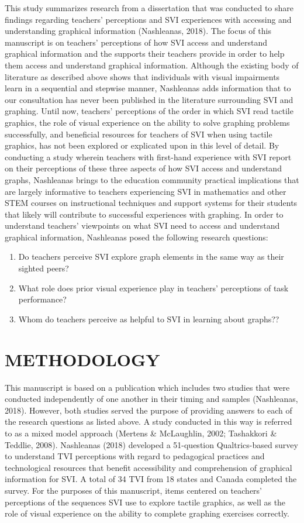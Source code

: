 \documentclass[11.5pt]{sig-alternate} %
\begin{document}
\begin{large}
This study summarizes research from a dissertation that was conducted to share findings regarding teachers’ perceptions and SVI experiences with accessing and understanding graphical information (Nashleanas, 2018). The focus of this manuscript is on teachers’ perceptions of how SVI access and understand graphical information and the supports their teachers provide in order to help them access and understand graphical information. Although the existing body of literature as described above shows that individuals with visual impairments learn in a sequential and stepwise manner, Nashleanas adds information that to our consultation has never been published in the literature surrounding SVI and graphing. Until now, teachers’ perceptions of the order in which SVI read tactile graphics, the role of visual experience on the ability to solve graphing problems successfully, and beneficial resources for teachers of SVI when using tactile graphics, has not been explored or explicated upon in this level of detail. By conducting a study wherein teachers with first-hand experience with SVI report on their perceptions of these three aspects of how SVI access and understand graphs, Nashleanas brings to the education community practical implications that are largely informative to teachers experiencing SVI in mathematics and other STEM courses on instructional techniques and support systems for their students that likely will contribute to successful experiences with graphing. In order to understand teachers’ viewpoints on what SVI need to access and understand graphical information, Nashleanas posed the following research questions:
\begin{enumerate}
    \item Do teachers perceive SVI explore graph elements in the same way as their sighted peers?
    \item What role does prior visual experience play in teachers’ perceptions of task performance?
    \item Whom do teachers perceive as helpful to SVI in learning about graphs??
\end{enumerate}
\section*{METHODOLOGY}

This manuscript is based on a publication which includes two studies that were conducted independently of one another in their timing and samples (Nashleanas, 2018). However, both studies served the purpose of providing answers to each of the research questions as listed above. A study conducted in this way is referred to as a mixed model approach (Mertens \& McLaughlin, 2002; Tashakkori \& Teddlie, 2008). Nashleanas (2018) developed a 51-question Qualtrics-based survey to understand TVI perceptions with regard to pedagogical practices and technological resources that benefit accessibility and comprehension of graphical information for SVI. A total of 34 TVI from 18 states and Canada completed the survey. For the purposes of this manuscript, items centered on teachers’ perceptions of the sequences SVI use to explore tactile graphics, as well as the role of visual experience on the ability to complete graphing exercises correctly.
 

\end{large}
\end{document}
